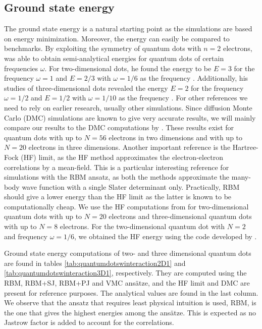 \subsection{Ground state energy} \label{sec:groundstateenergy}
The ground state energy is a natural starting point as the simulations are based on energy minimization. Moreover, the energy can easily be compared to benchmarks. By exploiting the symmetry of quantum dots with $n=2$ electrons, \citeauthor{taut_two_1993} was able to obtain semi-analytical energies for quantum dots of certain frequencies $\omega$. For two-dimensional dots, he found the energy to be $E=3$ for the frequency $\omega=1$ and $E=2/3$ with $\omega=1/6$ as the frequency \supercite{taut_two_1993}. Additionally, his studies of three-dimensional dots revealed the energy $E=2$ for the frequency $\omega=1/2$ and $E=1/2$ with $\omega=1/10$ as the frequency \supercite{taut_two_1994}. For other references we need to rely on earlier research, usually other simulations. Since diffusion Monte Carlo (DMC) simulations are known to give very accurate results, we will mainly compare our results to the DMC computations by \citet{hogberget_quantum_2013}. These results exist for quantum dots with up to $N=56$ electrons in two dimensions and with up to $N=20$ electrons in three dimensions. Another important reference is the Hartree-Fock (HF) limit, as the HF method approximates the electron-electron correlations by a mean-field. This is a particular interesting reference for simulations with the RBM ansatz, as both the methods approximate the many-body wave function with a single Slater determinant only. Practically, RBM should give a lower energy than the HF limit as the latter is known to be computationally cheap. We use the HF computations from \citet{mariadason_quantum_2018} for two-dimensional quantum dots with up to $N=20$ electrons and three-dimensional quantum dots with up to $N=8$ electrons. For the two-dimensional quantum dot with $N=2$ and frequency $\omega=1/6$, we obtained the HF energy using the code developed by \citet{mariadason_hartreefock_2018}.

Ground state energy computations of two- and three dimensional quantum dots are found in tables \eqref{tab:quantumdotswinteraction2D1} and \eqref{tab:quantumdotswinteraction3D1}, respectively. They are computed using the RBM, RBM+SJ, RBM+PJ and VMC ansätze, and the HF limit and DMC are present for reference purposes. The analytical values are found in the last column. We observe that the ansatz that requires least physical intuition is used, RBM, is the one that gives the highest energies among the ansätze. This is expected as no Jastrow factor is added to account for the correlations. 

